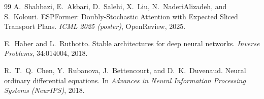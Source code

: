 \documentclass[11pt]{article}
\numberwithin{equation}{section}
\theoremstyle{plain}
\theoremstyle{definition}
\theoremstyle{remark}
\begin{document}
\begin{thebibliography}{99}
A.~Shahbazi, E.~Akbari, D.~Salehi, X.~Liu, N.~NaderiAlizadeh, and S.~Kolouri.
\newblock ESPFormer: Doubly-Stochastic Attention with Expected Sliced Transport Plans.
\newblock \emph{ICML 2025 (poster)}, OpenReview, 2025.


E.~Haber and L.~Ruthotto.
\newblock Stable architectures for deep neural networks.
\newblock \emph{Inverse Problems}, 34:014004, 2018.

R.~T.~Q.~Chen, Y.~Rubanova, J.~Bettencourt, and D.~K.~Duvenaud.
\newblock Neural ordinary differential equations.
\newblock In \emph{Advances in Neural Information Processing Systems (NeurIPS)}, 2018.

 
 

\end{thebibliography}
\end{document}
